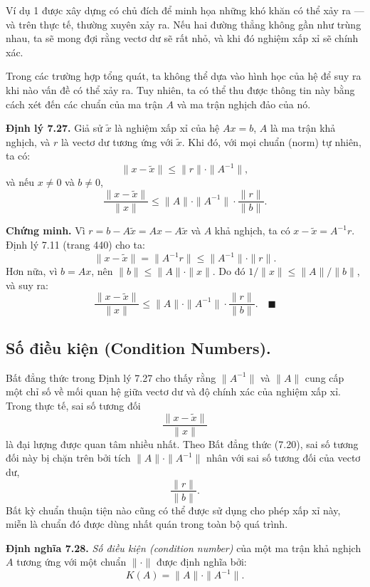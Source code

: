 Ví dụ 1 được xây dựng có chủ đích để minh họa những khó khăn có thể xảy ra — 
và trên thực tế, thường xuyên xảy ra. 
Nếu hai đường thẳng không gần như trùng nhau, ta sẽ mong đợi rằng 
vectơ dư sẽ rất nhỏ, và khi đó nghiệm xấp xỉ sẽ chính xác.  

Trong các trường hợp tổng quát, ta không thể dựa vào hình học của hệ 
để suy ra khi nào vấn đề có thể xảy ra. 
Tuy nhiên, ta có thể thu được thông tin này bằng cách xét đến các chuẩn 
của ma trận \( A \) và ma trận nghịch đảo của nó.

\textbf{Định lý 7.27.}  
Giả sử \( \tilde{x} \) là nghiệm xấp xỉ của hệ \( A x = b \), 
\( A \) là ma trận khả nghịch, và \( r \) là vectơ dư tương ứng với \( \tilde{x} \).  
Khi đó, với mọi chuẩn (norm) tự nhiên, ta có:
\[
\|x - \tilde{x}\| \leq \|r\| \cdot \|A^{-1}\|,
\]
và nếu \( x \neq 0 \) và \( b \neq 0 \),
\[
\frac{\|x - \tilde{x}\|}{\|x\|} \leq \|A\| \cdot \|A^{-1}\| \cdot \frac{\|r\|}{\|b\|}.
\tag{7.20}
\]

\textbf{Chứng minh.}  
Vì \( r = b - A\tilde{x} = A x - A\tilde{x} \) và \( A \) khả nghịch, ta có
\( x - \tilde{x} = A^{-1} r \).  
Định lý 7.11 (trang 440) cho ta:
\[
\|x - \tilde{x}\| = \|A^{-1} r\| \leq \|A^{-1}\| \cdot \|r\|.
\]
Hơn nữa, vì \( b = A x \), nên \( \|b\| \leq \|A\| \cdot \|x\| \).  
Do đó \( 1/\|x\| \leq \|A\| / \|b\| \), và suy ra:
\[
\frac{\|x - \tilde{x}\|}{\|x\|} 
\leq \|A\| \cdot \|A^{-1}\| \cdot \frac{\|r\|}{\|b\|}.
\quad \blacksquare
\]

\subsection{Số điều kiện (Condition Numbers).}  
Bất đẳng thức trong Định lý 7.27 cho thấy rằng \( \|A^{-1}\| \) và \( \|A\| \)
cung cấp một chỉ số về mối quan hệ giữa vectơ dư và độ chính xác của nghiệm xấp xỉ.  
Trong thực tế, sai số tương đối 
\[
\frac{\|x - \tilde{x}\|}{\|x\|}
\]
là đại lượng được quan tâm nhiều nhất.  
Theo Bất đẳng thức (7.20), sai số tương đối này bị chặn trên bởi 
tích \( \|A\| \cdot \|A^{-1}\| \) nhân với sai số tương đối của vectơ dư, 
\[
\frac{\|r\|}{\|b\|}.
\]
Bất kỳ chuẩn thuận tiện nào cũng có thể được sử dụng cho phép xấp xỉ này, 
miễn là chuẩn đó được dùng nhất quán trong toàn bộ quá trình.

\textbf{Định nghĩa 7.28.}  
\textit{Số điều kiện (condition number)} của một ma trận khả nghịch \( A \)
tương ứng với một chuẩn \( \|\cdot\| \) được định nghĩa bởi:
\[
K(A) = \|A\| \cdot \|A^{-1}\|.
\]

